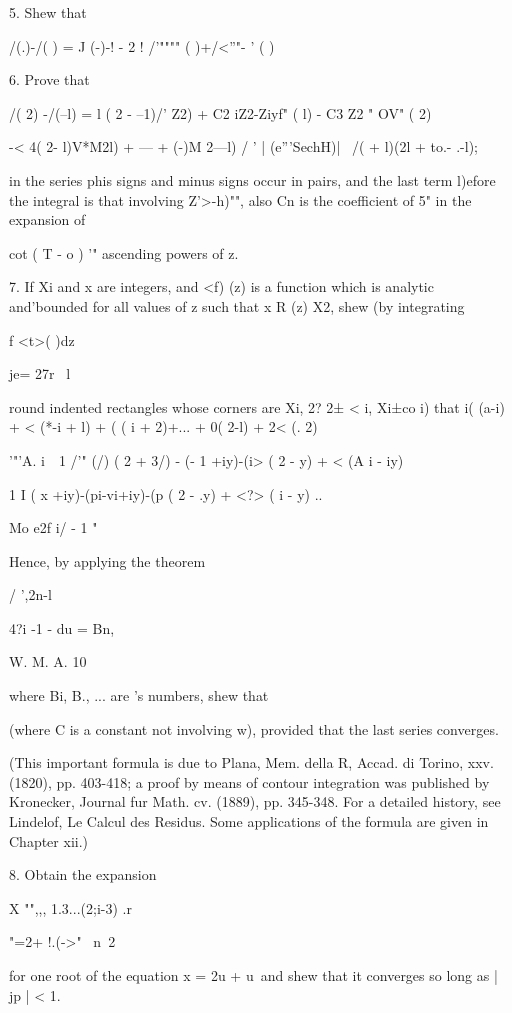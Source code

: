 {{5. Shew that

/(.)-/( ) = J (-)-! - 2 ! /'"""" ( )+/<''"- ' ( )

6. Prove that

/( 2) -/(--l) = l ( 2 - --1)/' Z2) + C2 iZ2-Ziyf" ( l) - C3 Z2 " OV" (
2)

-< 4( 2- l)V*M2l) + --- + (-)M 2---l) / ' | (e'''SechH)| \ /( + l)(2l
+ to.- .-l);

in the series phis signs and minus signs occur in pairs, and the last
term l)efore the integral is that involving Z'>-h)"", also Cn is the
coefficient of 5" in the expansion of

cot ( T - o ) '" ascending powers of z. 

7. If Xi and x are integers, and <f) (z) is a function which is
analytic and'bounded for all values of z such that x R (z) X2, shew
(by integrating

f <t>( )dz

je= 27r \ l

round indented rectangles whose corners are Xi, 2? 2± < i, Xi±co i)
that i( (a-i) + < (*-i + l) + ( ( i + 2)+... + 0( 2-l) + 2< (. 2)

'"'A. i~\, 1 /'" (/) ( 2 + 3/) - (- 1 +iy)-(i> ( 2 - y) + < (A i -
iy)

1 I ( x +iy)-(pi-vi+iy)-(p ( 2 - .y) + <?> ( i - y) ..

Mo e2f i/ - 1  "

Hence, by applying the theorem

/ ',2n-l

4?i -1 - du = Bn,

W. M. A. 10

%
%

where Bi, B., ... are \Bernoulli's numbers, shew that

(where C is a constant not involving w), provided that the last series
converges.

(This important formula is due to Plana, Mem. della R, Accad. di
Torino, xxv. (1820), pp. 403-418; a proof by means of contour
integration was published by Kronecker, Journal fur Math. cv. (1889),
pp. 345-348. For a detailed history, see Lindelof, Le Calcul des
Residus. Some applications of the formula are given in Chapter xii.)

8. Obtain the expansion

X "",,, 1.3...(2;i-3) .r

"=2+ !.(->"~ n\ 2

for one root of the equation x = 2u + u\ and shew that it converges so
long as | jp | < 1.

}}
